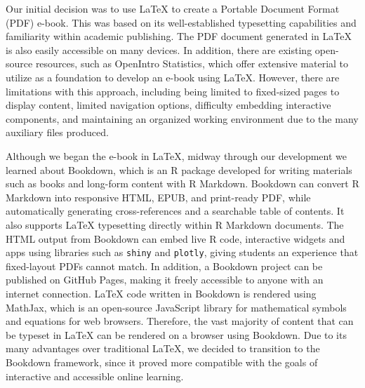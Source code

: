 \documentclass[11pt]{article}
\begin{document}
Our initial decision was to use LaTeX to create a Portable Document Format (PDF) e-book.
This was based on its well-established typesetting capabilities and familiarity within academic publishing.
The PDF document generated in LaTeX is also easily accessible on many devices.
In addition, there are existing open-source resources, such as OpenIntro Statistics, which offer extensive material to utilize as a foundation to develop an e-book using LaTeX.
However, there are limitations with this approach, including being limited to fixed-sized pages to display content, limited navigation options, difficulty embedding interactive components, and maintaining an organized working environment due to the many auxiliary files produced.

Although we began the e-book in LaTeX, midway through our development we learned about Bookdown, which is an R package developed for writing materials such as books and long-form content with R Markdown. 
Bookdown can convert R Markdown into responsive HTML, EPUB, and print-ready PDF, while automatically generating cross-references and a searchable table of contents. It also supports LaTeX typesetting directly within R Markdown documents. The HTML output from Bookdown can embed live R code, interactive widgets and apps using libraries such as \texttt{shiny} and \texttt{plotly}, giving students an experience that fixed-layout PDFs cannot match. In addition, a Bookdown project can be published on GitHub Pages, making it freely accessible to anyone with an internet connection.
LaTeX code written in Bookdown is rendered using MathJax, which is an open-source JavaScript library for mathematical symbols and equations for web browsers.
Therefore, the vast majority of content that can be typeset in LaTeX can be rendered on a browser using Bookdown.
Due to its many advantages over traditional LaTeX, we decided to transition to the Bookdown framework, since it proved more compatible with the goals of interactive and accessible online learning. 
\end{document}
